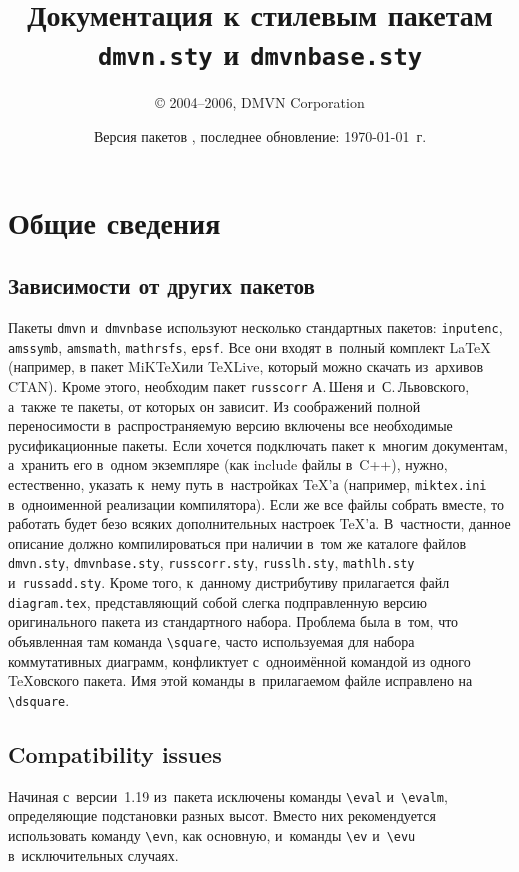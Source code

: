 \documentclass[a4paper]{article}
\title{Документация к стилевым пакетам \texttt{dmvn.sty} и \texttt{dmvnbase.sty}}
\author{\copyright{} 2004--2006, DMVN Corporation}
\date{Версия пакетов \dmvnversion, последнее обновление: \today~г.}
\newcommand{\pkgdmvn}{\texttt{dmvn}}
\newcommand{\pkgbase}{\texttt{dmvnbase}}
\newcommand{\pkgrusscorr}{\texttt{russcorr}}
\begin{document}
\maketitle

\dmvntrail

\tableofcontents
\pagebreak

\section{Общие сведения}

\subsection{Зависимости от других пакетов}
Пакеты \pkgdmvn{} и~\pkgbase{} используют несколько стандартных пакетов: \texttt{inputenc}, \texttt{amssymb},
\texttt{amsmath}, \texttt{mathrsfs}, \texttt{epsf}. Все они входят в~полный комплект \LaTeX{} (например, в пакет
MiK\TeX или \TeX{}Live, который можно скачать из~архивов CTAN). Кроме этого, необходим пакет \pkgrusscorr{} А.\,Шеня и~С.\,Львовского,
а~также те пакеты, от которых он зависит. Из соображений полной переносимости в~распространяемую версию включены
все необходимые русификационные пакеты. Если хочется подключать пакет к~многим документам, а~хранить
его в~одном экземпляре (как include файлы в~C++),
нужно, естественно, указать к~нему путь в~настройках \TeX'а (например, \texttt{miktex.ini} в~одноименной
реализации компилятора). Если же все файлы собрать вместе, то работать будет безо всяких
дополнительных настроек \TeX'а. В~частности, данное описание должно компилироваться при наличии в~том же
каталоге файлов \texttt{dmvn.sty}, \texttt{dmvnbase.sty}, \texttt{russcorr.sty}, \texttt{russlh.sty},
\texttt{mathlh.sty} и~\texttt{russadd.sty}. Кроме того, к~данному дистрибутиву прилагается файл
\texttt{diagram.tex}, представляющий собой слегка подправленную версию оригинального пакета из стандартного
набора. Проблема была в~том, что объявленная там команда \verb'\square', часто используемая для набора
коммутативных диаграмм, конфликтует с~одноимённой командой из одного \AmS\TeX  овского пакета. Имя этой
команды в~прилагаемом файле исправлено на \verb'\dsquare'.

\subsection{Compatibility issues}

Начиная с~версии~1.19 из~пакета исключены команды \verb'\eval' и~\verb'\evalm', определяющие
подстановки разных высот. Вместо них рекомендуется использовать команду \verb'\evn',
как основную, и~команды \verb'\ev' и~\verb'\evu' в~исключительных случаях.
\end{document}
